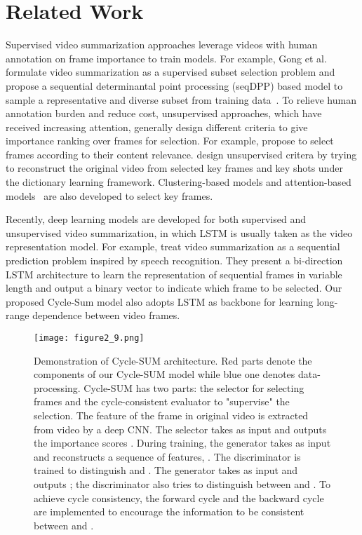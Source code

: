 \documentclass[letterpaper]{article} \usepackage{aaai19}  \usepackage{times}  \usepackage{helvet}  \usepackage{courier}  \usepackage{url}  \usepackage{graphicx}  \frenchspacing  \setlength{\pdfpagewidth}{8.5in}  \setlength{\pdfpageheight}{11in}  \usepackage{amsmath}
\begin{document}
\section{Related Work}
Supervised video summarization approaches leverage videos with human annotation on frame importance to train models. For example, Gong et al. formulate video summarization as a supervised subset selection problem and propose a sequential determinantal point processing (seqDPP) based model to sample a representative and diverse subset from training data~\cite{gong2014diverse}. To relieve human annotation burden and reduce cost, unsupervised approaches, which have received increasing attention, generally design different criteria to give importance ranking over frames for selection. For example,   \cite{wang2012event,potapov2014category} propose to select frames according to their content relevance. \cite{mei2015video,cong2012towards} design unsupervised critera by  trying to reconstruct the original video from selected key frames and key shots under the dictionary learning framework. Clustering-based models \cite{de2011vsumm,kuanar2013video} and attention-based models~\cite{ma2002user,ejaz2013efficient} are also developed to select key frames.

Recently, deep learning models are developed for both supervised and unsupervised video summarization, in which LSTM is usually taken as the video representation model. For example,  \cite{zhang2016video} treat video summarization as a sequential prediction problem inspired by speech recognition. They present a bi-direction LSTM architecture to learn the representation of sequential frames in variable length and output a binary vector to indicate which frame to be selected. Our proposed Cycle-Sum model also adopts LSTM as backbone for learning long-range dependence between video frames.

\begin{figure*}[!tp]
\centering
\texttt{[image: figure2\_9.png]}
\caption{\footnotesize Demonstration of Cycle-SUM architecture. Red parts denote the components of our Cycle-SUM model while blue one denotes data-processing. Cycle-SUM has two parts: the selector for selecting frames and the cycle-consistent evaluator to "supervise" the selection. The feature of the frame in original video  is extracted from video  by a deep CNN. The selector takes  as input and outputs the importance scores . During training, the generator  takes  as input and reconstructs a sequence of features, . The discriminator  is trained to distinguish  and . The generator  takes  as input and outputs ; the discriminator  also tries to distinguish between  and . To achieve cycle consistency, the forward cycle  and the backward cycle  are implemented to encourage the information to be consistent between  and .}
\label{fig:arch}
\end{figure*}
\end{document}

